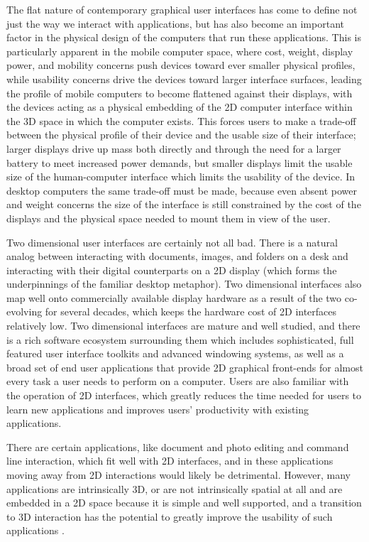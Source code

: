 The flat nature of contemporary graphical user interfaces has come to define not just the way we interact with applications, but has also become an important factor in the physical design of the computers that run these applications. This is particularly apparent in the mobile computer space, where cost, weight, display power, and mobility concerns push devices toward ever smaller physical profiles, while usability concerns drive the devices toward larger interface surfaces, leading the profile of mobile computers to become flattened against their displays, with the devices acting as a physical embedding of the 2D computer interface within the 3D space in which the computer exists. This forces users to make a trade-off between the physical profile of their device and the usable size of their interface; larger displays drive up mass both directly and through the need for a larger battery to meet increased power demands, but smaller displays limit the usable size of the human-computer interface which limits the usability of the device. In desktop computers the same trade-off must be made, because even absent power and weight concerns the size of the interface is still constrained by the cost of the displays and the physical space needed to mount them in view of the user.

Two dimensional user interfaces are certainly not all bad. There is a natural analog between interacting with documents, images, and folders on a desk and interacting with their digital counterparts on a 2D display (which forms the underpinnings of the familiar desktop metaphor). Two dimensional interfaces also map well onto commercially available display hardware as a result of the two co-evolving for several decades, which keeps the hardware cost of 2D interfaces relatively low. Two dimensional interfaces are mature and well studied, and there is a rich software ecosystem surrounding them which includes sophisticated, full featured user interface toolkits and advanced windowing systems, as well as a broad set of end user applications that provide 2D graphical front-ends for almost every task a user needs to perform on a computer. Users are also familiar with the operation of 2D interfaces, which greatly reduces the time needed for users to learn new applications and improves users' productivity with existing applications. 

There are certain applications, like document and photo editing and command line interaction, which fit well with 2D interfaces, and in these applications moving away from 2D interactions would likely be detrimental. However, many applications are intrinsically 3D, or are not intrinsically spatial at all and are embedded in a 2D space because it is simple and well supported, and a transition to 3D interaction has the potential to greatly improve  the usability of such applications \cite{bowman_theory_practice}.

